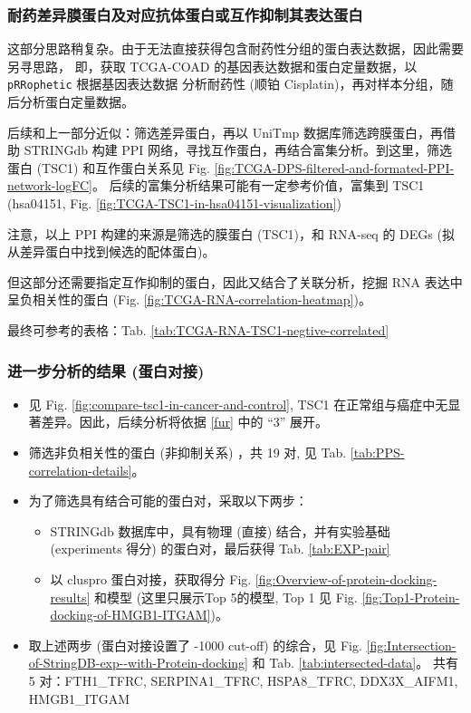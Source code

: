 \documentclass[
]{article}
\providecommand{\tightlist}{%
  \setlength{\itemsep}{0pt}\setlength{\parskip}{0pt}}
\begin{document}
\hypertarget{ux8010ux836fux5deeux5f02ux819cux86cbux767dux53caux5bf9ux5e94ux6297ux4f53ux86cbux767dux6216ux4e92ux4f5cux6291ux5236ux5176ux8868ux8fbeux86cbux767d}{%
\subsubsection{耐药差异膜蛋白及对应抗体蛋白或互作抑制其表达蛋白}\label{ux8010ux836fux5deeux5f02ux819cux86cbux767dux53caux5bf9ux5e94ux6297ux4f53ux86cbux767dux6216ux4e92ux4f5cux6291ux5236ux5176ux8868ux8fbeux86cbux767d}}

这部分思路稍复杂。由于无法直接获得包含耐药性分组的蛋白表达数据，因此需要另寻思路，
即，获取 TCGA-COAD 的基因表达数据和蛋白定量数据，以 \texttt{pRRophetic} 根据基因表达数据
分析耐药性 (顺铂 Cisplatin)，再对样本分组，随后分析蛋白定量数据。

后续和上一部分近似：筛选差异蛋白，再以 UniTmp 数据库筛选跨膜蛋白，再借助 STRINGdb 构建
PPI 网络，寻找互作蛋白，再结合富集分析。到这里，筛选蛋白 (TSC1) 和互作蛋白关系见
Fig. \ref{fig:TCGA-DPS-filtered-and-formated-PPI-network-logFC}。
后续的富集分析结果可能有一定参考价值，富集到 TSC1
(hsa04151, Fig. \ref{fig:TCGA-TSC1-in-hsa04151-visualization})

注意，以上 PPI 构建的来源是筛选的膜蛋白 (TSC1)，和 RNA-seq 的 DEGs (拟从差异蛋白中找到候选的配体蛋白)。

但这部分还需要指定互作抑制的蛋白，因此又结合了关联分析，挖掘 RNA 表达中呈负相关性的蛋白
(Fig. \ref{fig:TCGA-RNA-correlation-heatmap})。

最终可参考的表格：Tab. \ref{tab:TCGA-RNA-TSC1-negtive-correlated}

\hypertarget{res-fur}{%
\subsubsection{进一步分析的结果 (蛋白对接)}\label{res-fur}}

\begin{itemize}
\tightlist
\item
  见 Fig. \ref{fig:compare-tsc1-in-cancer-and-control},
  TSC1 在正常组与癌症中无显著差异。因此，后续分析将依据 \ref{fur} 中的 ``3'' 展开。
\item
  筛选非负相关性的蛋白 (非抑制关系) ，共 19 对, 见 Tab. \ref{tab:PPS-correlation-details}。
\item
  为了筛选具有结合可能的蛋白对，采取以下两步：

  \begin{itemize}
  \tightlist
  \item
    STRINGdb 数据库中，具有物理 (直接) 结合，并有实验基础 (experiments 得分) 的蛋白对，最后获得 Tab. \ref{tab:EXP-pair}
  \item
    以 cluspro 蛋白对接，获取得分 Fig. \ref{fig:Overview-of-protein-docking-results}
    和模型 (这里只展示Top 5的模型, Top 1 见 Fig. \ref{fig:Top1-Protein-docking-of-HMGB1-ITGAM})。
  \end{itemize}
\item
  取上述两步 (蛋白对接设置了 -1000 cut-off) 的综合，见 Fig. \ref{fig:Intersection-of-StringDB-exp--with-Protein-docking}
  和 Tab. \ref{tab:intersected-data}。
  共有 5 对：FTH1\_TFRC, SERPINA1\_TFRC, HSPA8\_TFRC, DDX3X\_AIFM1, HMGB1\_ITGAM
\end{itemize}
\end{document}
